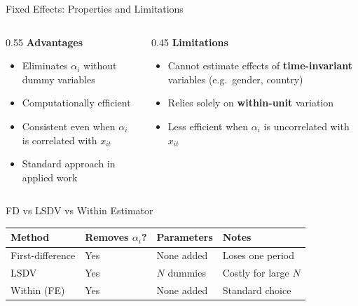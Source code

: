 \documentclass[aspectratio=169]{beamer}
\begin{document}
\begin{frame}{Fixed Effects: Properties and Limitations}
  \begin{columns}[T]
    \begin{column}{0.55\textwidth}
      \textbf{Advantages}
      \begin{itemize}
        \item Eliminates $\alpha_i$ without dummy variables
        \item Computationally efficient
        \item Consistent even when $\alpha_i$ is correlated with $x_{it}$
        \item Standard approach in applied work
      \end{itemize}
    \end{column}
    \begin{column}{0.45\textwidth}
      \textbf{Limitations}
      \begin{itemize}
        \item Cannot estimate effects of \textbf{time-invariant} variables (e.g.\ gender, country)
        \item Relies solely on \textbf{within-unit} variation
        \item Less efficient when $\alpha_i$ is uncorrelated with $x_{it}$
      \end{itemize}
    \end{column}
  \end{columns}
\end{frame}

\begin{frame}{FD vs LSDV vs Within Estimator}
  \begin{center}
    \begin{tabular}{llll}
      \toprule
      \textbf{Method} & \textbf{Removes $\alpha_i$?} & \textbf{Parameters} & \textbf{Notes} \\
      \midrule
      First-difference & Yes & None added  & Loses one period \\
      LSDV             & Yes & $N$ dummies & Costly for large $N$ \\
      Within (FE)      & Yes & None added  & Standard choice \\
      \bottomrule
    \end{tabular}
  \end{center}

  \vspace{0.6em}
\end{frame}
\end{document}
